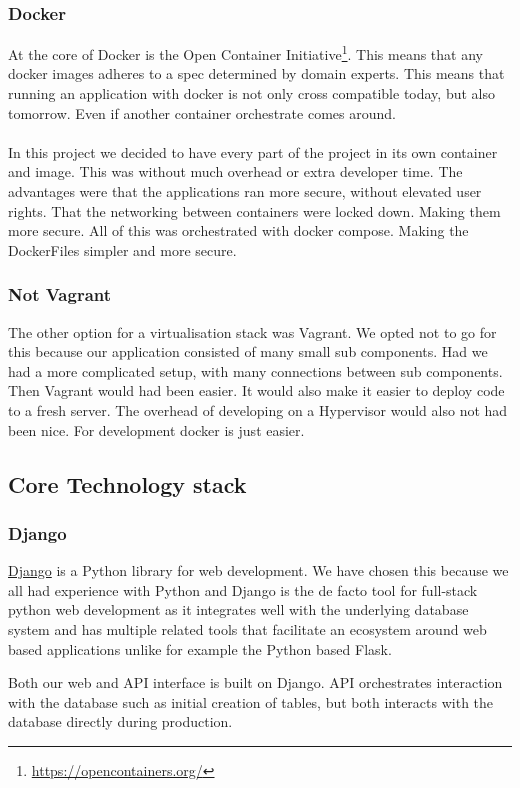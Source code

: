 \documentclass[12pt]{article}
\begin{document}
\subsubsection{Docker}
At the core of Docker is the Open Container Initiative\footnote{\url{https://opencontainers.org/}}. This means that any docker images adheres to a spec determined by domain experts. This means that running an application with docker is not only cross compatible today, but also tomorrow. Even if another container orchestrate comes around. 
\\\\
In this project we decided to have every part of the project in its own container and image. This was without much overhead or extra developer time. The advantages were that the applications ran more secure, without elevated user rights. That the networking between containers were locked down. Making them more secure. All of this was orchestrated with docker compose. Making the DockerFiles simpler and more secure.   

\subsubsection{Not Vagrant}
The other option for a virtualisation stack was Vagrant. We opted not to go for this because our application consisted of many small sub components. Had we had a more complicated setup, with many connections between sub components. Then Vagrant would had been easier. It would also make it easier to deploy code to a fresh server. The overhead of developing on a Hypervisor would also not had been nice. For development docker is just easier. 
\subsection{Core Technology stack}

\subsubsection{Django}
\href{https://www.Djangoproject.com/}{Django} is a Python library for web development. We have chosen this because we all had experience with Python and Django is the de facto tool for full-stack python web development as it integrates well with the underlying database system and has multiple related tools that facilitate an ecosystem around web based applications unlike for example the Python based Flask. 

Both our web and API interface is built on Django. API orchestrates interaction with the database such as initial creation of tables, but both interacts with the database directly during production.
\end{document}
